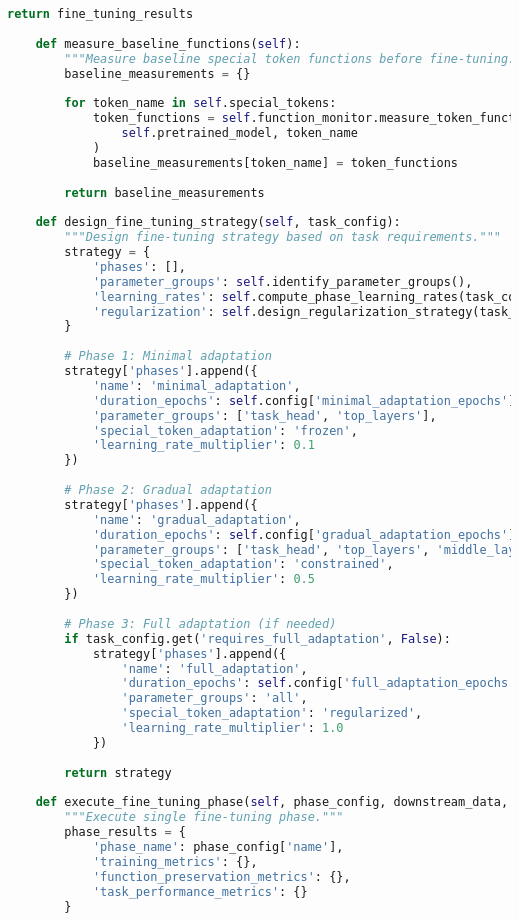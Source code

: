 \begin{lstlisting}[language=Python, caption=Function-preserving fine-tuning framework]
        return fine_tuning_results
    
    def measure_baseline_functions(self):
        """Measure baseline special token functions before fine-tuning."""
        baseline_measurements = {}
        
        for token_name in self.special_tokens:
            token_functions = self.function_monitor.measure_token_functions(
                self.pretrained_model, token_name
            )
            baseline_measurements[token_name] = token_functions
        
        return baseline_measurements
    
    def design_fine_tuning_strategy(self, task_config):
        """Design fine-tuning strategy based on task requirements."""
        strategy = {
            'phases': [],
            'parameter_groups': self.identify_parameter_groups(),
            'learning_rates': self.compute_phase_learning_rates(task_config),
            'regularization': self.design_regularization_strategy(task_config)
        }
        
        # Phase 1: Minimal adaptation
        strategy['phases'].append({
            'name': 'minimal_adaptation',
            'duration_epochs': self.config['minimal_adaptation_epochs'],
            'parameter_groups': ['task_head', 'top_layers'],
            'special_token_adaptation': 'frozen',
            'learning_rate_multiplier': 0.1
        })
        
        # Phase 2: Gradual adaptation
        strategy['phases'].append({
            'name': 'gradual_adaptation',
            'duration_epochs': self.config['gradual_adaptation_epochs'],
            'parameter_groups': ['task_head', 'top_layers', 'middle_layers'],
            'special_token_adaptation': 'constrained',
            'learning_rate_multiplier': 0.5
        })
        
        # Phase 3: Full adaptation (if needed)
        if task_config.get('requires_full_adaptation', False):
            strategy['phases'].append({
                'name': 'full_adaptation',
                'duration_epochs': self.config['full_adaptation_epochs'],
                'parameter_groups': 'all',
                'special_token_adaptation': 'regularized',
                'learning_rate_multiplier': 1.0
            })
        
        return strategy
    
    def execute_fine_tuning_phase(self, phase_config, downstream_data, task_config):
        """Execute single fine-tuning phase."""
        phase_results = {
            'phase_name': phase_config['name'],
            'training_metrics': {},
            'function_preservation_metrics': {},
            'task_performance_metrics': {}
        }
        

\end{lstlisting}
